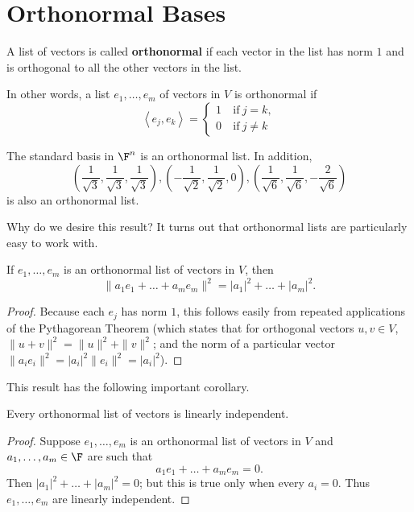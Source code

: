 \documentclass[math0540-lecture-notes.tex]{subfiles}
\begin{document}
\section{Orthonormal Bases}

\begin{definition}[Orthonormal]{}
  A list of vectors is called \textbf{orthonormal} if each vector in the list has norm $1$ and is
  orthogonal to all the other vectors in the list.

  In other words, a list $e_1,\ldots,e_m$ of vectors in $V$ is orthonormal if \[
    \left<e_j,e_k \right>=\left\{\begin{array}{rl} 1 & ~\text{if}~j=k,\\ 0 &~\text{if}~j\neq k
    \end{array}\right.\] 
\end{definition}

\begin{example}
  The standard basis in $\F^{n}$ is an orthonormal list. In addition, \[
    \left( \frac{1}{\sqrt{3}},\frac{1}{\sqrt{3}},\frac{1}{\sqrt{3}} \right), \left(- \frac{1}{\sqrt{2}},
    \frac{1}{\sqrt{2}}, 0\right), \left( \frac{1}{\sqrt{6}},\frac{1}{\sqrt{6}}, - \frac{2}{\sqrt{6}} \right) 
  \] is also an orthonormal list.
\end{example}

Why do we desire this result? It turns out that orthonormal lists are particularly easy to work
with.

\begin{proposition}{}
  If $e_1,\ldots,e_m$ is an orthonormal list of vectors in $V$, then \[
    \|a_1e_1+\ldots+a_me_m\|^2=\left| a_1 \right| ^2+\ldots+\left| a_m \right| ^2
  .\] 
\end{proposition}
\begin{proof}[Proof]
  Because each $e_j$ has norm $1$, this follows easily from repeated applications of the Pythagorean
  Theorem (which states that for orthogonal vectors $u,v\in V$, $\|u+v\|^2=\|u\|^2+\|v\|^2$; and the
  norm of a particular vector $\|a_ie_i\|^2=\left| a_i \right| ^2\|e_i\|^2=\left| a_i \right| ^2$).
\end{proof}

This result has the following important corollary.
\begin{corollary}{}
  Every orthonormal list of vectors is linearly independent.
\end{corollary}
\begin{proof}[Proof]
  Suppose $e_1,\ldots,e_m$ is an orthonormal list of vectors in $V$ and $a_1,\ldots,a_m\in \F$ are
  such that \[
    a_1e_1+\ldots+a_me_m=0
  .\] Then $\left| a_1 \right|^2+\ldots+\left| a_m \right| ^2=0 $; but this is true only when every
  $a_i=0$. Thus $e_1,\ldots,e_m$ are linearly independent.
\end{proof}
\end{document}
